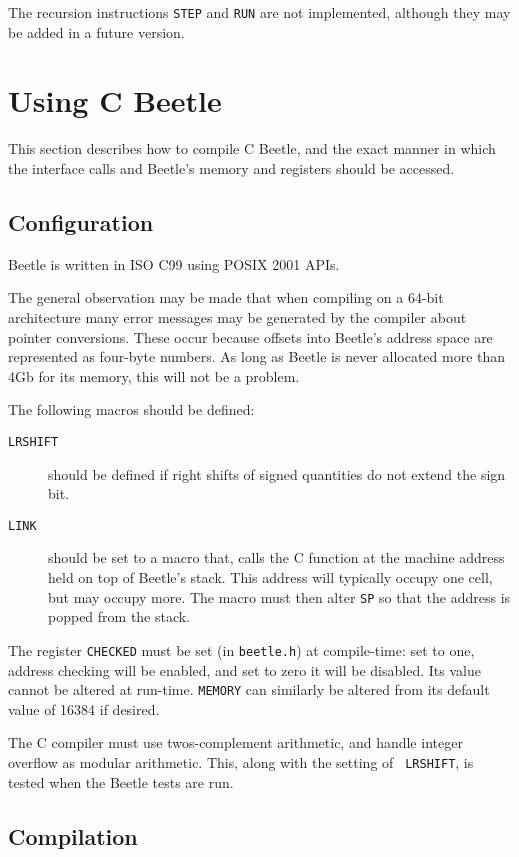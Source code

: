 \documentclass{article}
\begin{document}
The recursion instructions {\tt STEP} and {\tt RUN} are not implemented,
although they may be added in a future version.


\section{Using C Beetle}

This section describes how to compile C Beetle, and the exact manner in which
the interface calls and Beetle's memory and registers should be accessed.


\subsection{Configuration}
\label{configuration}

Beetle is written in ISO C99 using POSIX 2001 APIs.

The general observation may be made that when compiling on
a 64-bit architecture many error messages may be generated by the
compiler about pointer conversions. These occur because offsets into Beetle's
address space are represented as four-byte numbers. As long as Beetle is
never allocated more than 4Gb for its memory, this will not be a problem.

The following macros should be defined:

\begin{description}
\item[{\tt LRSHIFT}]should be defined if right shifts of signed
  quantities do not extend the sign bit.
\item[{\tt LINK}]should be set to a macro that, calls the C function
  at the machine address held on top of Beetle's stack. This address
  will typically occupy one cell, but may occupy more. The macro must
  then alter {\tt SP} so that the address is popped from the stack.
\end{description}

The register {\tt CHECKED} must be set (in {\tt beetle.h}) at compile-time:
set to one, address checking will be enabled, and set to zero it will be
disabled. Its value cannot be altered at run-time. {\tt MEMORY} can similarly
be altered from its default value of 16384 if desired.

The C compiler must use twos-complement arithmetic, and handle integer
overflow as modular arithmetic. This, along with the setting of {\tt
  LRSHIFT}, is tested when the Beetle tests are run.


\subsection{Compilation}
\end{document}
